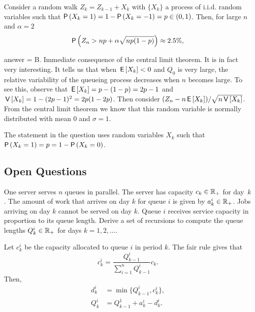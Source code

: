 \begin{exercise}[201902]
  Consider a random walk $Z_k = Z_{k-1} + X_k$ with $\{X_k\}$ a process of i.i.d. random variables such that $\P{X_k=1} = 1-\P{X_k=-1} = p \in (0, 1)$. Then, for large $n$ and $\alpha = 2$
  \begin{equation*}
    \P{Z_n >  np + \alpha \sqrt{np(1-p)}} \approx 2.5\%, 
  \end{equation*}


\begin{solution}
answer = B. Immediate consequence of the central limit theorem. It is in fact very interesting. It tells us that when $\,\mathsf{E}\left[X_k\right] < 0$ and $Q_0$ is very large, the relative variability of the queueing process decreases  when $n$ becomes large. To see this, observe that $\,\mathsf{E}\left[X_k\right] = p - (1-p)=2p-1$ and $\,\mathsf{V}\left[X_k\right] = 1 - (2p-1)^2 = 2p(1-2p)$. Then consider $(Z_n - n\,\mathsf{E}\left[X_k\right])/\sqrt{n\,\mathsf{V}\left[X_k\right]}$. From the central limit theorem we know that this random variable is normally distributed with mean 0 and $\sigma=1$. 

The statement in the question uses random variables $X_k$ such that $\P{X_k=1}=p = 1- \P{X_k=0}$. 
\end{solution}
\end{exercise}

\subsection{Open Questions}


\begin{exercise}[201704] One server serves $n$ queues in parallel. The
  server has capacity $c_k\in \mathbb{R}_+$ for day~$k$.  The amount of work
  that arrives on day $k$ for queue $i$ is given by $a_k^i\in \mathbb{R}_+$.
  Jobs arriving on day $k$ cannot be served on day $k$. Queue $i$
  receives service capacity in proportion to its queue length.  Derive
  a set of recursions  to compute the queue lengths $Q_k^i \in \mathbb{R}_+$ for days $k=1,2,\ldots$. 
  \begin{solution}
    Let $c_k^i$ be the capacity allocated to queue $i$ in period $k$. The fair rule gives that 
    \begin{equation*}
      c_k^i = \frac{Q_{k-1}^i}{\sum_{i=1}^n Q_{k-1}^i } c_k.
    \end{equation*}
Then, 
\begin{equation*}
  \begin{split}
      d_k^i &= \min\{Q_{k-1}^i, c^i_k\}, \\
Q_k^i &= Q_{k-1}^1+a_k^i  - d_k^i.
  \end{split}
\end{equation*}
  \end{solution}
  \end{exercise}

